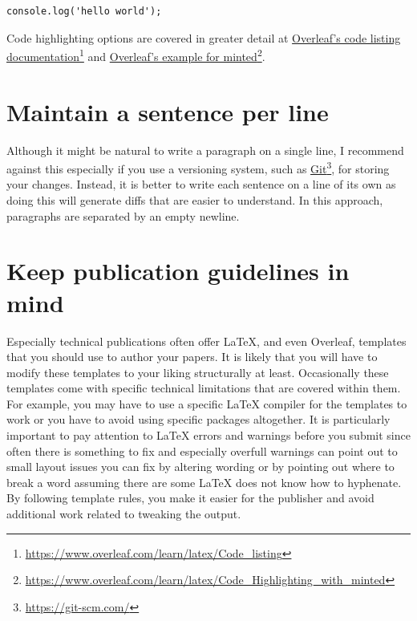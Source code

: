 \begin{overbatim}
\begin{verbatim}
console.log('hello world');
\end{verbatim}
\end{overbatim}

Code highlighting options are covered in greater detail at \href{https://www.overleaf.com/learn/latex/Code_listing}{Overleaf's code listing documentation}\footnote{\url{https://www.overleaf.com/learn/latex/Code_listing}} and \href{https://www.overleaf.com/learn/latex/Code_Highlighting_with_minted}{Overleaf's example for minted}\footnote{\url{https://www.overleaf.com/learn/latex/Code_Highlighting_with_minted}}.

\section{Maintain a sentence per line}

Although it might be natural to write a paragraph on a single line, I recommend against this especially if you use a versioning system, such as \href{https://git-scm.com/}{Git}\footnote{\url{https://git-scm.com/}}, for storing your changes.
Instead, it is better to write each sentence on a line of its own as doing this will generate diffs that are easier to understand.
In this approach, paragraphs are separated by an empty newline.

\section{Keep publication guidelines in mind}

Especially technical publications often offer LaTeX, and even Overleaf, templates that you should use to author your papers.
It is likely that you will have to modify these templates to your liking structurally at least.
Occasionally these templates come with specific technical limitations that are covered within them.
For example, you may have to use a specific LaTeX compiler for the templates to work or you have to avoid using specific packages altogether.
It is particularly important to pay attention to LaTeX errors and warnings before you submit since often there is something to fix and especially overfull warnings can point out to small layout issues you can fix by altering wording or by pointing out where to break a word assuming there are some LaTeX does not know how to hyphenate.
By following template rules, you make it easier for the publisher and avoid additional work related to tweaking the output.


